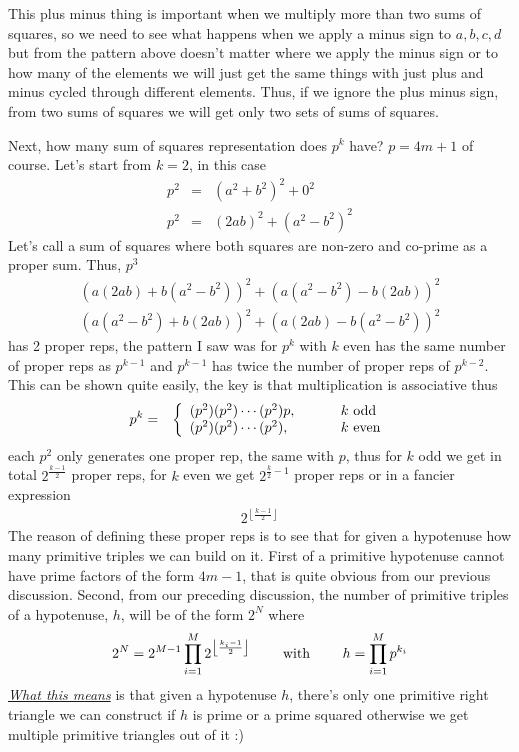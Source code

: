 \documentclass[aps,preprint,preprintnumbers,nofootinbib,showpacs,prd]{revtex4-1}
\newcommand{\nbea}{\begin{eqnarray*}}
\newcommand{\neea}{\end{eqnarray*}}
\begin{document}
This plus minus thing is important when we multiply more than two sums of squares, so we need to see what happens when we apply a minus sign to $a,b,c,d$ but from the pattern above doesn't matter where we apply the minus sign or to how many of the elements we will just get the same things with just plus and minus cycled through different elements. Thus, if we ignore the plus minus sign, from two sums of squares we will get only two sets of sums of squares.

Next, how many sum of squares representation does $p^k$ have? $p = 4m+1$ of course. Let's start from $k=2$, in this case
%
\nbea
p^2 & = & (a^2 + b^2)^2 + 0^2 \\
p^2 & = & (2ab)^2 + (a^2 - b^2)^2
\neea
%
Let's call a sum of squares where both squares are non-zero and co-prime as a proper sum. Thus, $p^3$ 
%
\nbea
(a(2ab) + b(a^2 - b^2))^2 + (a(a^2 - b^2) - b(2ab))^2 \\
(a(a^2 - b^2) + b(2ab))^2 + (a(2ab) - b(a^2 - b^2))^2
\neea
%
has 2 proper reps, the pattern I saw was for $p^k$ with $k$ even has the same number of proper reps as $p^{k-1}$ and $p^{k-1}$ has twice the number of proper reps of $p^{k-2}$. This can be shown quite easily, the key is that multiplication is associative thus
%
\nbea
p^{k} & = & \left\{
\begin{array}{l l}
(p^2)(p^2)\cdots(p^2)p, & ~~~~~~~k~{\rm odd} \\
(p^2)(p^2)\cdots(p^2), & ~~~~~~~k~{\rm even}
\end{array}
\right.
\neea
%
each $p^2$ only generates one proper rep, the same with $p$, thus for $k$ odd we get in total $2^{\frac{k-1}{2}}$ proper reps, for $k$ even we get $2^{\frac{k}{2}-1}$ proper reps or in a fancier expression
%
\nbea
2^{\left\lfloor\frac{k-1}{2}\right\rfloor}
\neea
%
The reason of defining these proper reps is to see that for given a hypotenuse how many primitive triples we can build on it. First of a primitive hypotenuse cannot have prime factors of the form $4m-1$, that is quite obvious from our previous discussion. Second, from our preceding discussion, the number of primitive triples of a hypotenuse, $h$, will be of the form $2^{N}$ where
%
\nbea
2^N = 2^{M-1}\prod_{i=1}^M 2^{\left\lfloor\frac{k_i-1}{2}\right\rfloor} ~~~~~~~{\rm with} ~~~~~~~ h = \prod_{i=1}^M p^{k_i}
\neea
%
\underline{\textit{What this means}} is that given a hypotenuse $h$, there's only one primitive right triangle we can construct if $h$ is prime or a prime squared otherwise we get multiple primitive triangles out of it :)
\end{document}

